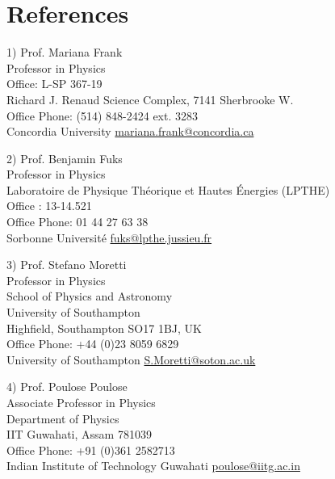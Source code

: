 \documentclass[]{friggeri-cv}
\begin{document}
\newpage	

\section{References}
	
	\begin{entrylist}
		
		\entry
		{1)}
		{Prof. Mariana Frank \\ \normalfont
		Professor in Physics \\
		Office: 	L-SP 367-19 \\
		Richard J. Renaud Science Complex, 7141 Sherbrooke W. 	\\
		Office Phone: 	(514) 848-2424 ext. 3283 \\
		Concordia University}
		{\href{mariana.frank@concordia.ca}{mariana.frank@concordia.ca}} 
		

			
		\entry
		{2)}
		{Prof. Benjamin Fuks \\ \normalfont
		Professor in Physics \\	
		Laboratoire de Physique Théorique et Hautes Énergies (LPTHE) \\	
		Office : 	13-14.521 \\
		Office Phone: 	01 44 27 63 38	\\
		Sorbonne Université}
		{\href{fuks@lpthe.jussieu.fr}{fuks@lpthe.jussieu.fr}} 		
	
	    \entry
		{3)}
		{Prof. Stefano Moretti  \\ \normalfont
		Professor in Physics \\	
		School of Physics and Astronomy \\
		University of Southampton \\
		Highfield, Southampton SO17 1BJ, UK	\\
		Office Phone: 	+44 (0)23 8059 6829 \\
		University of Southampton}
		{\href{S.Moretti@soton.ac.uk}{S.Moretti@soton.ac.uk}} 			
	
		\entry
		{4)}
		{Prof. Poulose Poulose \\ \normalfont
		Associate Professor in Physics \\		
		Department of Physics \\
		IIT Guwahati, Assam 781039 \\
		Office Phone: +91 (0)361 2582713 \\			
		Indian Institute of Technology Guwahati}
		{\href{poulose@iitg.ac.in}{poulose@iitg.ac.in}} 					


\end{entrylist}
\end{document}
